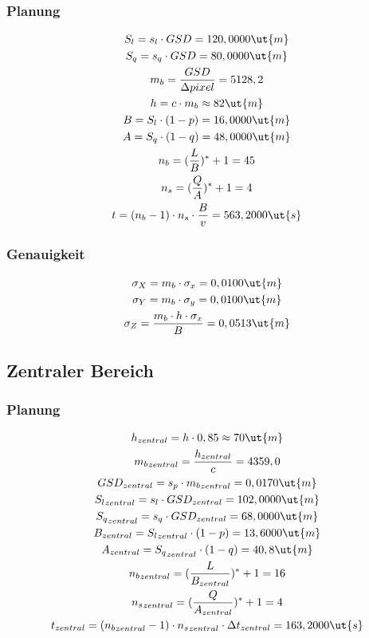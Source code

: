 \subsubsection{Planung}
\begin{gather*}
	S_l = s_l \cdot GSD = 120,0000 \ut{m} \\
	S_q = s_q \cdot GSD = 80,0000 \ut{m} \\
	m_b = \frac{GSD}{\Delta pixel} = 5128,2 \\
	h = c \cdot m_b \approx 82 \ut{m}  \\
	B = S_l \cdot (1-p) = 16,0000 \ut{m} \\
	A = S_q \cdot (1-q) = 48,0000 \ut{m} \\
	n_b = (\frac{L}{B})^* + 1 = 45 \\
	n_s = (\frac{Q}{A})^* + 1 = 4 \\	
	t = (n_b - 1) \cdot n_s \cdot \frac{B}{v} = 563,2000 \ut{s} \\
\end{gather*}
\subsubsection{Genauigkeit}
\begin{gather*}
	\sigma_X = m_b \cdot \sigma_x = 0,0100 \ut{m} \\
	\sigma_Y = m_b \cdot \sigma_y = 0,0100 \ut{m} \\
	\sigma_Z = \frac{m_b \cdot h \cdot \sigma_x}{B} = 0,0513 \ut{m}
\end{gather*}
\subsection{Zentraler Bereich}
\subsubsection{Planung}
\begin{gather*}
	h_{zentral} = h \cdot 0,85 \approx 70 \ut{m} \\
	{m_b}_{zentral}  = \frac{h_{zentral}}{c} = 4359,0 \\
	GSD_{zentral} = s_p \cdot {m_b}_{zentral} = 0,0170 \ut{m} \\
	{S_l}_{zentral} = s_l \cdot GSD_{zentral} = 102,0000 \ut{m} \\
	{S_q}_{zentral} = s_q \cdot GSD_{zentral} = 68,0000 \ut{m} \\
	B_{zentral} = {S_l}_{zentral} \cdot (1-p) = 13,6000 \ut{m} \\
	A_{zentral} = {S_q}_{zentral} \cdot (1-q) = 40,8 \ut{m} \\
	{n_b}_{zentral} = (\frac{L}{B_{zentral}})^* + 1 = 16 \\
	{n_s}_{zentral} = (\frac{Q}{A_{zentral}})^* + 1 = 4 \\	
	t_{zentral} = ({n_b}_{zentral} - 1) \cdot {n_s}_{zentral} \cdot \Delta t_{zentral} = 163,2000 \ut{s} \\
\end{gather*}

